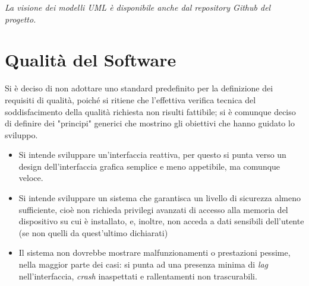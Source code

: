 \documentclass{article}
\begin{document}
\textit{\textcolor{black!60}{La visione dei modelli UML è disponibile anche dal repository Github del progetto.}}

\section{Qualità del Software}
Si è deciso di non adottare uno standard predefinito per la definizione dei requisiti di qualità, poiché si ritiene che l'effettiva verifica tecnica del soddisfacimento della qualità richiesta non risulti fattibile; si è comunque deciso di definire dei "principi" generici che mostrino gli obiettivi che hanno guidato lo sviluppo.

\begin{itemize}
    \item Si intende sviluppare un'interfaccia reattiva, per questo si punta verso un design dell'interfaccia grafica semplice e meno appetibile, ma comunque veloce. 
    \item Si intende sviluppare un sistema che garantisca un livello di sicurezza almeno sufficiente, cioè non richieda privilegi avanzati di accesso alla memoria del dispositivo su cui è installato, e, inoltre, non acceda a dati sensibili dell'utente (se non quelli da quest'ultimo dichiarati)
    \item Il sistema non dovrebbe mostrare malfunzionamenti o prestazioni pessime, nella maggior parte dei casi: si punta ad una presenza minima di \textit{lag} nell'interfaccia, \textit{crash} inaspettati e rallentamenti non trascurabili. 
\end{itemize}
\end{document}
